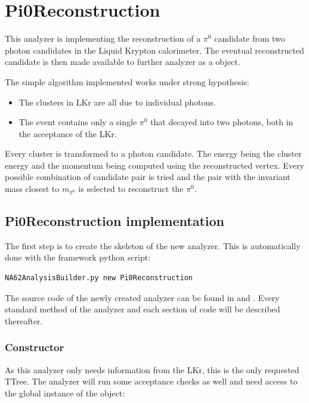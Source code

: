 \section{Pi0Reconstruction}

This analyzer is implementing the reconstruction of a $\pi^0$ candidate from two photon candidates
in the Liquid Krypton calorimeter. The eventual reconstructed candidate is then made available to
further analyzer as a  object. 

The simple algorithm implemented works under strong hypothesis: 
\begin{itemize}
  \item The clusters in LKr are all due to individual photons.
  \item The event contains only a single $\pi^0$ that decayed into two photons, both in the
  acceptance of the LKr.
\end{itemize}
Every cluster is transformed to a photon candidate. The energy being the cluster energy and the
momentum being computed using the reconstructed vertex. Every possible combination of candidate pair
is tried and the pair with the invariant mass closest to $m_{\pi^0}$ is selected to reconstruct the
$\pi^0$. 

\subsection{Pi0Reconstruction implementation}

The first step is to create the skeleton of the new analyzer. This is
automatically done with the framework python script:
\begin{lstlisting}
NA62AnalysisBuilder.py new Pi0Reconstruction
\end{lstlisting}

The source code of the newly created analyzer can be found in
 and .
Every standard method of the analyzer and each section of code will be described thereafter.

\subsubsection{Constructor}
As this analyzer only needs information from the LKr, this is the only requested TTree. The
analyzer will run some acceptance checks as well and need access to the global instance of the
 object:

